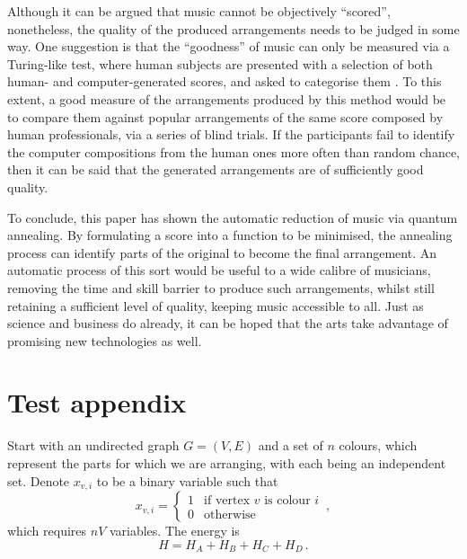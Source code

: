 \documentclass[12pt]{article}
\begin{document}
Although it can be argued that music cannot be objectively ``scored'', nonetheless, the quality of the produced arrangements needs to be judged in some way. One suggestion is that the ``goodness'' of music can only be measured via a Turing-like test, where human subjects are presented with a selection of both human- and computer-generated scores, and asked to categorise them . To this extent, a good measure of the arrangements produced by this method would be to compare them against popular arrangements of the same score composed by human professionals, via a series of blind trials. If the participants fail to identify the computer compositions from the human ones more often than random chance, then it can be said that the generated arrangements are of sufficiently good quality.

To conclude, this paper has shown the automatic reduction of music via quantum annealing. By formulating a score into a function to be minimised, the annealing process can identify parts of the original to become the final arrangement. An automatic process of this sort would be useful to a wide calibre of musicians, removing the time and skill barrier to produce such arrangements, whilst still retaining a sufficient level of quality, keeping music accessible to all. Just as science and business do already, it can be hoped that the arts take advantage of promising new technologies as well.

\printbibliography[heading=bibintoc]

\clearpage
\appendix
\section{Test appendix}

Start with an undirected graph $G=(V,E)$ and a set of $n$ colours, which represent the parts for which we are arranging, with each being an independent set. Denote $x_{v,i}$ to be a binary variable such that
\begin{equation*}
    x_{v,i} =
    \begin{cases}
        1 & \text{if vertex $v$ is colour $i$} \\
        0 & \text{otherwise}
    \end{cases}
    \,,
\end{equation*}
which requires $nV$ variables. The energy is
\begin{equation*}
    H = H_A + H_B + H_C + H_D \,.
\end{equation*}
\end{document}
